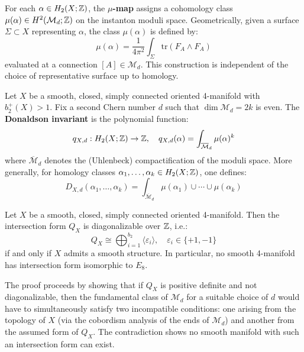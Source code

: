 \begin{definition}
For each $\alpha \in H_2(X; \mathbb{Z})$, the \textbf{$\mu$-map} assigns a cohomology class $\mu(\alpha) \in H^2(\mathcal{M}_d; \mathbb{Z})$ on the instanton moduli space. Geometrically, given a surface $\Sigma \subset X$ representing $\alpha$, the class $\mu(\alpha)$ is defined by:
\[
\mu(\alpha) = \frac{1}{4\pi^2} \int_\Sigma \mathrm{tr}(F_A \wedge F_A)
\]
evaluated at a connection $[A] \in \mathcal{M}_d$. This construction is independent of the choice of representative surface up to homology.
\end{definition}

\begin{definition}
Let $X$ be a smooth, closed, simply connected oriented 4-manifold with $b_2^+(X) > 1$. Fix a second Chern number $d$ such that $\dim \mathcal{M}_d = 2k$ is even. The \textbf{Donaldson invariant} is the polynomial function:
\[
q_{X,d} : H_2(X; \mathbb{Z}) \to \mathbb{Z}, \quad q_{X,d}(\alpha) = \int_{\overline{\mathcal{M}}_d} \mu(\alpha)^k
\]
where $\overline{\mathcal{M}}_d$ denotes the (Uhlenbeck) compactification of the moduli space. More generally, for homology classes $\alpha_1, \ldots, \alpha_k \in H_2(X; \mathbb{Z})$, one defines:
\[
D_{X,d}(\alpha_1, \ldots, \alpha_k) = \int_{\overline{\mathcal{M}}_d} \mu(\alpha_1) \cup \cdots \cup \mu(\alpha_k)
\]
\end{definition}

\begin{theorem}
Let $X$ be a smooth, closed, simply connected oriented 4-manifold. Then the intersection form $Q_X$ is diagonalizable over $\mathbb{Z}$, i.e.:
\[
Q_X \cong \bigoplus_{i=1}^{b_2} \langle \varepsilon_i \rangle, \quad \varepsilon_i \in \{+1, -1\}
\]
if and only if $X$ admits a smooth structure. In particular, no smooth 4-manifold has intersection form isomorphic to $E_8$.
\end{theorem}

\begin{remark}
The proof proceeds by showing that if $Q_X$ is positive definite and not diagonalizable, then the fundamental class of $\mathcal{M}_d$ for a suitable choice of $d$ would have to simultaneously satisfy two incompatible conditions: one arising from the topology of $X$ (via the cobordism analysis of the ends of $\mathcal{M}_d$) and another from the assumed form of $Q_X$. The contradiction shows no smooth manifold with such an intersection form can exist.
\end{remark}

